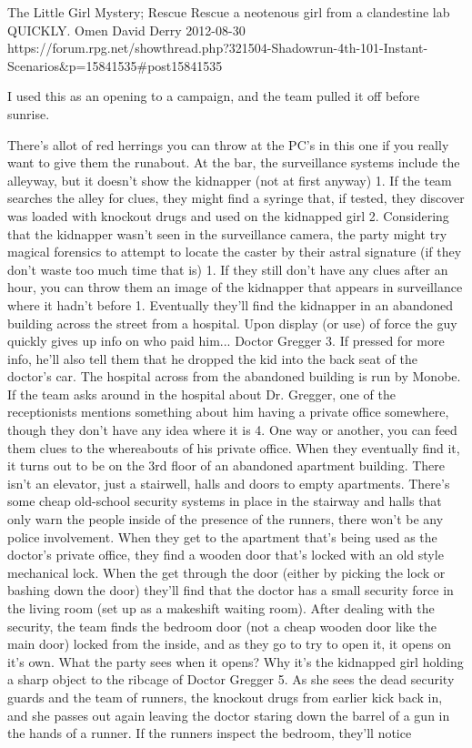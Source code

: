 \begin{scenario}{The Little Girl}
	{Mystery; Rescue}
	{Rescue a neotenous girl from a clandestine lab QUICKLY.}
	{Omen David Derry}
	{2012-08-30}
	{https://forum.rpg.net/showthread.php?321504-Shadowrun-4th-101-Instant-Scenarios\&p=15841535#post15841535}

 I used this as an opening to a campaign, and the team pulled it off before sunrise.


\synopsis  There's allot of red herrings you can throw at the PC's in this one if you really want to give them the runabout. At the bar, the surveillance systems include the alleyway, but it doesn't show the kidnapper (not at first anyway) 1. If the team searches the alley for clues, they might find a syringe that, if tested, they discover was loaded with knockout drugs and used on the kidnapped girl 2. Considering that the kidnapper wasn't seen in the surveillance camera, the party might try magical forensics to attempt to locate the caster by their astral signature (if they don't waste too much time that is) 1. If they still don't have any clues after an hour, you can throw them an image of the kidnapper that appears in surveillance where it hadn't before 1. Eventually they'll find the kidnapper in an abandoned building across the street from a hospital. Upon display (or use) of force the guy quickly gives up info on who paid him... Doctor Gregger 3. If pressed for more info, he'll also tell them that he dropped the kid into the back seat of the doctor's car. The hospital across from the abandoned building is run by Monobe. If the team asks around in the hospital about Dr. Gregger, one of the receptionists mentions something about him having a private office somewhere, though they don't have any idea where it is 4. One way or another, you can feed them clues to the whereabouts of his private office. When they eventually find it, it turns out to be on the 3rd floor of an abandoned apartment building. There isn't an elevator, just a stairwell, halls and doors to empty apartments. There's some cheap old-school security systems in place in the stairway and halls that only warn the people inside of the presence of the runners, there won't be any police involvement. When they get to the apartment that's being used as the doctor's private office, they find a wooden door that's locked with an old style mechanical lock. When the get through the door (either by picking the lock or bashing down the door) they'll find that the doctor has a small security force in the living room (set up as a makeshift waiting room). After dealing with the security, the team finds the bedroom door (not a cheap wooden door like the main door) locked from the inside, and as they go to try to open it, it opens on it's own. What the party sees when it opens? Why it's the kidnapped girl holding a sharp object to the ribcage of Doctor Gregger 5. As she sees the dead security guards and the team of runners, the knockout drugs from earlier kick back in, and she passes out again leaving the doctor staring down the barrel of a gun in the hands of a runner. If the runners inspect the bedroom, they'll notice 
\end{scenario}
